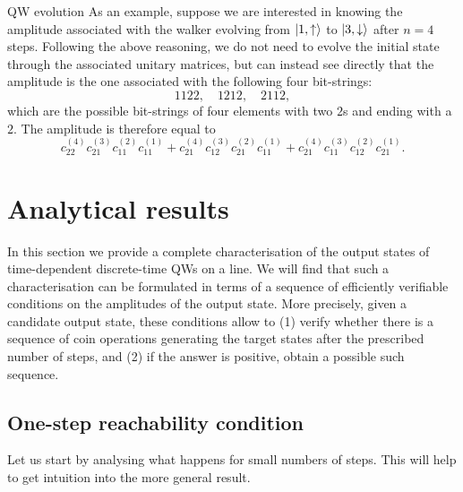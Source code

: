 \begin{examplebox}[label={ex:QWs:bimatrix_notation}]{QW evolution}
    As an example, suppose we are interested in knowing the amplitude associated with the walker evolving from $\ket{1,\uparrow}$ to $\ket{3,\downarrow}$ after $n=4$ steps. Following the above reasoning, we do not need to evolve the initial state through the associated unitary matrices, but can instead see directly that the amplitude is the one associated with the following four bit-strings:
    \begin{equation}
        1122, \quad 1212, \quad 2112,
    \end{equation}
    which are the possible bit-strings of four elements with two $2$s and ending with a $2$. The amplitude is therefore equal to
    \begin{equation}
        c^{(4)}_{22} c^{(3)}_{21} c^{(2)}_{11} c^{(1)}_{11} +
        c^{(4)}_{21} c^{(3)}_{12} c^{(2)}_{21} c^{(1)}_{11} +
        c^{(4)}_{21} c^{(3)}_{11} c^{(2)}_{12} c^{(1)}_{21}.
    \end{equation}
\end{examplebox}


\section{Analytical results}
\label{sec:QWs:reachability_conditions}

In this section we provide a complete characterisation of the output states of time-dependent discrete-time \acp{QW} on a line.
We will find that such a characterisation can be formulated in terms of a sequence of efficiently verifiable conditions on the amplitudes of the output state.
More precisely, given a candidate output state, these conditions allow to (1) verify whether there is a sequence of coin operations generating the target states after the prescribed number of steps, and (2) if the answer is positive, obtain a possible such sequence.

\subsection{One-step reachability condition}
\label{sec:QWs:1step_reachability}

Let us start by analysing what happens for small numbers of steps. This will help to get intuition into the more general result.

